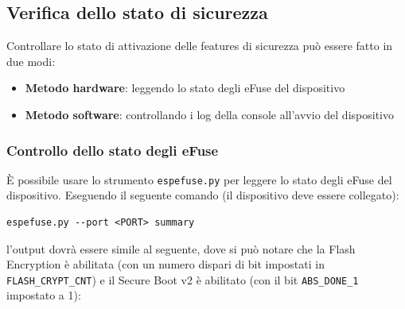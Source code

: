 \documentclass[a4paper]{article}
\begin{document}
\subsection{Verifica dello stato di sicurezza}
Controllare lo stato di attivazione delle features di sicurezza può essere
fatto in due modi:
\begin{itemize}
  \item \textbf{Metodo hardware}: leggendo lo stato degli eFuse del dispositivo
  \item \textbf{Metodo software}: controllando i log della console all'avvio del
    dispositivo
\end{itemize}

\subsubsection{Controllo dello stato degli eFuse}
È possibile usare lo strumento \texttt{espefuse.py} per leggere lo stato degli eFuse
del dispositivo. Eseguendo il seguente comando (il dispositivo deve essere collegato):
\begin{lstlisting}
espefuse.py --port <PORT> summary
\end{lstlisting}
l'output dovrà essere simile al seguente, dove si può notare che la Flash Encryption
è abilitata (con un numero dispari di bit impostati in \texttt{FLASH\_CRYPT\_CNT}) e
il Secure Boot v2 è abilitato (con il bit \texttt{ABS\_DONE\_1} impostato a 1):
\end{document}
